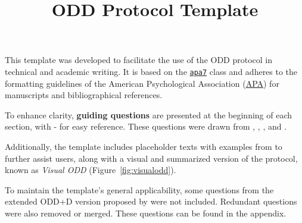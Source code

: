 















\title{ODD Protocol Template}
\author{}






\maketitle


This template was developed to facilitate the use of the ODD protocol \autocite{grimm2006a, grimm2020} in technical and academic writing. It is based on the \href{https://ctan.org/pkg/apa7}{\texttt{apa7}} class and adheres to the formatting guidelines of the American Psychological Association (\href{https://apastyle.apa.org/}{APA}) for manuscripts and bibliographical references.

To enhance clarity, \textbf{guiding questions} are presented at the beginning of each section, with - for easy reference. These questions were drawn from \autocite{grimm2010}, \autocite{grimm2020}, \autocite{muller2013}, and \autocite{railsback2019a}.

Additionally, the template includes placeholder texts with examples from \autocite{grimm2020} to further assist users, along with a visual and summarized version of the protocol, known as \textit{Visual ODD} \autocite{szangolies2024} (Figure~\ref{fig:visualodd}).

To maintain the template's general applicability, some questions from the extended ODD+D version proposed by \autocite{muller2013} were not included. Redundant questions were also removed or merged. These questions can be found in the appendix.

